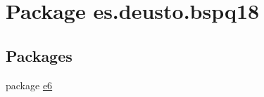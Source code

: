 \hypertarget{namespacees_1_1deusto_1_1bspq18}{}\section{Package es.\+deusto.\+bspq18}
\label{namespacees_1_1deusto_1_1bspq18}
\subsection*{Packages}
\begin{DoxyCompactItemize}
\item 
package \mbox{\hyperlink{namespacees_1_1deusto_1_1bspq18_1_1e6}{e6}}
\end{DoxyCompactItemize}
